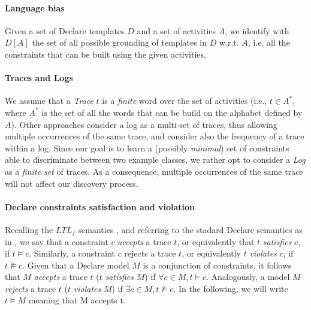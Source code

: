 \paragraph{Language bias} Given a set of Declare templates $D$ and a set of activities $A$, we identify with $D[A]$ the set of all possible grounding of templates in $D$ w.r.t. $A$, i.e. all the constraints that can be built using the given activities.

\paragraph{Traces and Logs} We assume that a \emph{Trace} $t$ is a \emph{finite} word over the set of activities (i.e., $t\in A^*$, where $A^*$ is the set of all the words that can be build on the alphabet defined by $A$).
%
Other approaches \cite{?}  consider a log as a multi-set of traces, thus allowing multiple occurrences of the same trace, and consider also the frequency of a trace within a log. Since our goal is to learn a (possibly \emph{minimal}) set of constraints able to discriminate between two example classes, we rather opt to consider a \emph{Log} as a \emph{finite set} of traces. As a consequence, multiple occurrences of the same trace will not affect our discovery process.
%

\paragraph{Declare constraints satisfaction and violation} Recalling the $LTL_f$ semantics \cite{DBLP:journals/tweb/MontaliPACMS10,DBLP:conf/ijcai/GiacomoV13}, and referring to the stadard Declare semantics as in \cite{2008-Pesic}, we say that a constraint $c$ \emph{accepts} a trace $t$, or equivalently that $t$ \emph{satisfies} $c$, if $t \models c$. Similarly, a constraint $c$ rejects a trace $t$, or equivalently $t$ \emph{violates} $c$, if $t \not\models c$. Given that a Declare model $M$ is a conjunction of constraints, it follows that $M$ \emph{accepts} a trace $t$ ($t$ \emph{satisfies} $M$) if $\forall c \in M, t \models c$. Analogously, a model $M$ \emph{rejects} a trace $t$ ($t$ \emph{violates} $M$) if $\exists c \in M, t\not\models c$. In the following, we will write $t \models M$ meaning that M accepts t.


